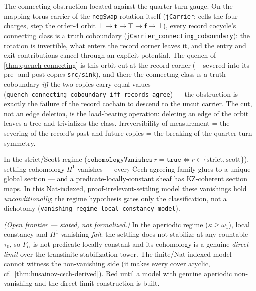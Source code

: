 \begin{theorem}\label{thm:connecting-j-symmetry-breaking}\leanok{}
The connecting obstruction located against the quarter-turn gauge. On the mapping-torus carrier
of the \texttt{negSwap} rotation itself (\texttt{jCarrier}: cells the four charges, step the
order-4 orbit $\bot \to \mathbf{t} \to \top \to \mathbf{f} \to \bot$), every record cocycle's
connecting class is a truth coboundary (\texttt{jCarrier\_connecting\_coboundary}): the
rotation is invertible, what enters the record corner leaves it, and the entry and exit
contributions cancel through an explicit potential. The quench of
\cref{thm:quench-connecting} is this orbit cut at the record corner ($\top$ severed into its
pre- and post-copies \texttt{src}/\texttt{sink}), and there the connecting class is a truth
coboundary \emph{iff} the two copies carry equal values
(\texttt{quench\_connecting\_coboundary\_iff\_records\_agree}) — the obstruction is exactly the
failure of the record cochain to descend to the uncut carrier. The cut, not an edge deletion,
is the load-bearing operation: deleting an edge of the orbit leaves a tree and trivializes the
class. Irreversibility of measurement = the severing of the record's past and future copies =
the breaking of the quarter-turn symmetry.
\end{theorem}

\begin{theorem}\label{thm:local-constancy-model}\leanok{}
In the strict/Scott regime ($\texttt{cohomologyVanishes}\,r=\texttt{true}\iff r\in\{\text{strict},\text{scott}\}$),
settling cohomology $H^1$ vanishes --- every \v{C}ech agreeing family glues to a unique global
section --- and a predicate-locally-constant sheaf has KZ-coherent section maps. In this
Nat-indexed, proof-irrelevant-settling model these vanishings hold \emph{unconditionally}; the
regime hypothesis gates only the classification, not a dichotomy
(\texttt{vanishing\_regime\_local\_constancy\_model}).
\end{theorem}

\begin{theorem}\label{thm:aperiodic-local-constancy-failure}\notready{}
\emph{(Open frontier --- stated, not formalized.)} In the aperiodic regime ($\kappa\ge\omega_1$),
local constancy and $H^1$-vanishing \emph{fail}: the settling does not stabilize at any countable
$\tau_0$, so $F_U$ is not predicate-locally-constant and its cohomology is a genuine \emph{direct
limit} over the transfinite stabilization tower. The finite/Nat-indexed model cannot witness the
non-vanishing side (it makes every cover acyclic, cf.\ \cref{thm:husainov-cech-derived}). Red until
a model with genuine aperiodic non-vanishing and the direct-limit construction is built.
\end{theorem}


